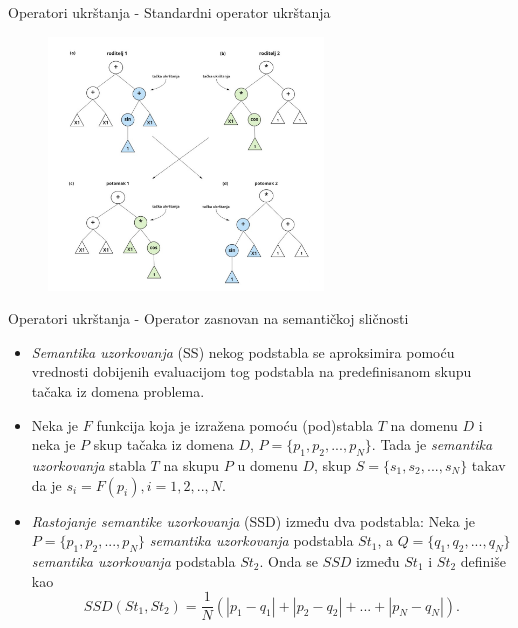 \documentclass{beamer}
\begin{document}
\begin{frame}{Operatori ukrštanja - Standardni operator ukrštanja}

\begin{figure}[!ht]
\begin{center}
\includegraphics[width=0.65\textwidth]{images/standard_crossover4.jpg}
\end{center}
\label{fig:standardCrossover}
\end{figure}

\end{frame}


\begin{frame}{Operatori ukrštanja - Operator zasnovan na semantičkoj sličnosti}
\begin{itemize}
\small
    \item \textit{Semantika uzorkovanja} (SS) nekog podstabla se aproksimira pomoću vrednosti dobijenih evaluacijom tog podstabla na predefinisanom skupu tačaka iz domena problema.
    \item Neka je $F$ funkcija koja je izražena pomoću (pod)stabla $T$ na domenu $D$ i neka je $P$ skup tačaka iz domena $D$, $P = \{p_1, p_2, ..., p_N\}$. Tada je \textit{semantika uzorkovanja} stabla $T$ na skupu $P$ u domenu $D$, skup $S = \{s_1, s_2, ..., s_N\}$ takav da je $s_i = F(p_i), i=1,2,..,N$.
    \item \textit{Rastojanje semantike uzorkovanja} (SSD) između dva podstabla: Neka je $P = \{p_1, p_2, ..., p_N\}$ \textit{semantika uzorkovanja} podstabla $St_1$, a $Q = \{q_1, q_2, ..., q_N\}$ \textit{semantika uzorkovanja} podstabla $St_2$. Onda se $SSD$ između $St_1$ i $St_2$ definiše kao 
    \[ SSD(St_1, St_2) = \frac{1}{N}(|p_1 - q_1| + |p_2 - q_2| + ... + |p_N - q_N|). \]
\end{itemize}
\end{frame}
\end{document}
